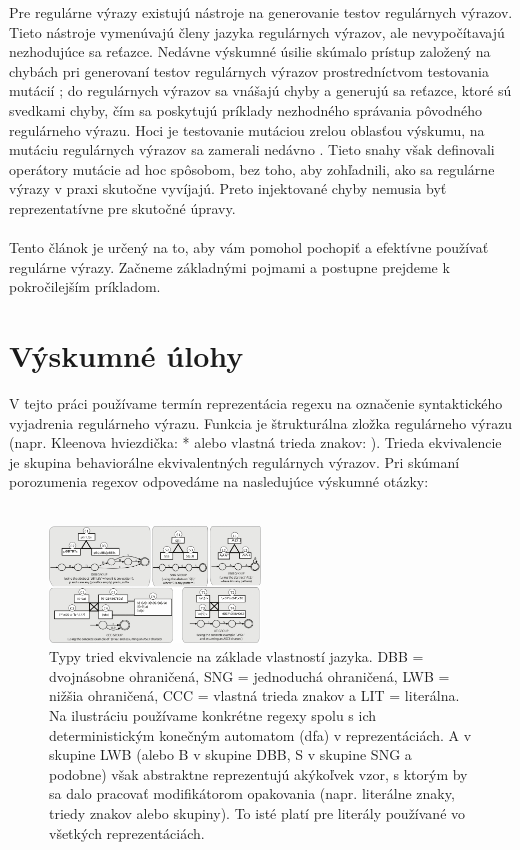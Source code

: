 \documentclass[10pt,twoside,slovak,a4paper]{article}
\begin{document}
Pre regulárne výrazy \cite{5477051} existujú nástroje na generovanie testov regulárnych výrazov. Tieto nástroje vymenúvajú členy jazyka regulárnych výrazov, ale nevypočítavajú nezhodujúce sa reťazce. Nedávne výskumné úsilie skúmalo prístup založený na chybách pri generovaní testov regulárnych výrazov prostredníctvom testovania mutácií \cite{7899040}; do regulárnych výrazov sa vnášajú chyby a generujú sa reťazce, ktoré sú svedkami chyby, čím sa poskytujú príklady nezhodného správania pôvodného regulárneho výrazu. Hoci je testovanie mutáciou zrelou oblasťou výskumu, na mutáciu regulárnych výrazov sa zamerali nedávno \cite{7899040} \cite{7374717}. Tieto snahy však definovali operátory mutácie ad hoc spôsobom, bez toho, aby zohľadnili, ako sa regulárne výrazy v praxi skutočne vyvíjajú. Preto injektované chyby nemusia byť reprezentatívne pre skutočné úpravy.\cite{Wang2019}\\
\\
Tento článok je určený na to, aby vám pomohol pochopiť a efektívne používať regulárne výrazy.  Začneme základnými pojmami a postupne prejdeme k pokročilejším príkladom.

\section{Výskumné úlohy}
V tejto práci používame termín reprezentácia regexu na označenie syntaktického vyjadrenia regulárneho výrazu. Funkcia je štrukturálna zložka regulárneho výrazu (napr. Kleenova hviezdička: * alebo vlastná trieda znakov: \cite{Chapman2017}). Trieda ekvivalencie je skupina behaviorálne ekvivalentných regulárnych výrazov. Pri skúmaní porozumenia regexov odpovedáme na nasledujúce výskumné otázky: \cite{Chapman2017}\\\\
\begin{figure}[h]
	\centering
	\includegraphics[width=0.5\textwidth]{obrazok1.png}
	\caption{Typy tried ekvivalencie na základe vlastností jazyka. DBB = dvojnásobne ohraničená, SNG = jednoduchá ohraničená, LWB = nižšia ohraničená, CCC = vlastná trieda znakov a LIT = literálna. Na ilustráciu používame konkrétne regexy spolu s ich deterministickým konečným automatom (dfa) v reprezentáciách. A v skupine LWB (alebo B v skupine DBB, S v skupine SNG a podobne) však abstraktne reprezentujú akýkoľvek vzor, s ktorým by sa dalo pracovať modifikátorom opakovania (napr. literálne znaky, triedy znakov alebo skupiny). To isté platí pre literály používané vo všetkých reprezentáciách. \cite{Chapman2017}}
	\label{fig:obrazok1}
  \end{figure}
\textbf{} \\\\
\end{document}
